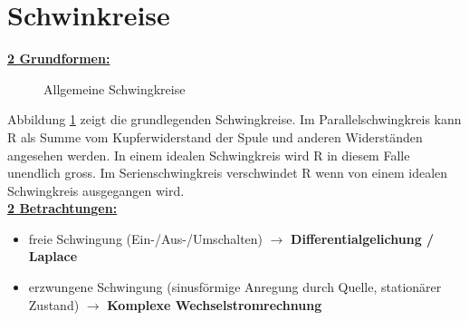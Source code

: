 \section{Schwinkreise}
\underline{\textbf{2 Grundformen:}}\\
\begin{figure}[!h]
\centering
{}
\qquad
{}
\caption{Allgemeine Schwingkreise}
\label{fig:schwingkreise}
\end{figure}

Abbildung \ref{fig:schwingkreise} zeigt die grundlegenden Schwingkreise. Im
Parallelschwingkreis  kann R als Summe vom
Kupferwiderstand der Spule und anderen Widerständen angesehen werden. In einem
idealen Schwingkreis wird R in diesem Falle unendlich gross. Im
Serienschwingkreis  verschwindet R wenn von
einem idealen Schwingkreis ausgegangen wird. \\

\underline{\textbf{2 Betrachtungen:}}\\
\begin{itemize}
  \item freie Schwingung (Ein-/Aus-/Umschalten) $\rightarrow$
  \textbf{Differentialgelichung / Laplace}
  \item erzwungene Schwingung (sinusförmige Anregung durch Quelle, stationärer
  Zustand) $\rightarrow$ \textbf{Komplexe Wechselstromrechnung}
\end{itemize}





